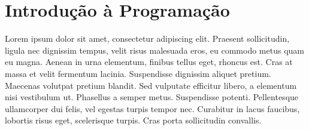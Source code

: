 \chapter{Introdução à Programação}
\label{chap:intro}

Lorem ipsum dolor sit amet, consectetur adipiscing elit. Praesent sollicitudin, ligula nec dignissim tempus, velit risus malesuada eros, eu commodo metus quam eu magna. Aenean in urna elementum, finibus tellus eget, rhoncus est. Cras at massa et velit fermentum lacinia. Suspendisse dignissim aliquet pretium. Maecenas volutpat pretium blandit. Sed vulputate efficitur libero, a elementum nisi vestibulum ut. Phasellus a semper metus. Suspendisse potenti. Pellentesque ullamcorper dui felis, vel egestas turpis tempor nec. Curabitur in lacus faucibus, lobortis risus eget, scelerisque turpis. Cras porta sollicitudin convallis.
